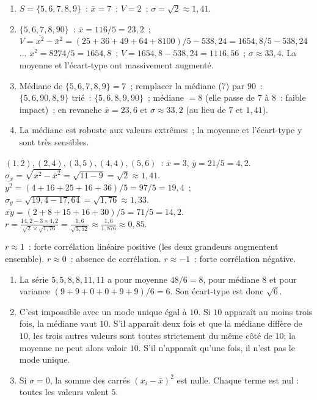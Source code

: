 
\begin{enumerate}
  \item $S=\{5,6,7,8,9\}$~: $\bar{x}=7$~; $V=2$~; $\sigma=\sqrt{2}\approx1{,}41$.
  \item $\{5,6,7,8,90\}$~: $\bar{x}=116/5=23{,}2$~;
        $V=\overline{x^2}-\bar{x}^2=(25+36+49+64+8100)/5-538{,}24=1654{,}8/5-538{,}24$
        ... $\overline{x^2}=8274/5=1654{,}8$~; $V=1654{,}8-538{,}24=1116{,}56$~; $\sigma\approx33{,}4$.
        La moyenne et l'\'ecart-type ont massivement augment\'e.
  \item M\'ediane de $\{5,6,7,8,9\}=7$~; remplacer la m\'ediane ($7$) par $90$~:
        $\{5,6,90,8,9\}$ tri\'e~: $\{5,6,8,9,90\}$~; m\'ediane $=8$ (elle passe de $7$ \`a $8$~: faible impact)~;
        en revanche $\bar{x}=23{,}6$ et $\sigma\approx33{,}2$ (au lieu de $7$ et $1{,}41$).
  \item La m\'ediane est robuste aux valeurs extr\^emes~; la moyenne et l'\'ecart-type y sont tr\`es sensibles.
\end{enumerate}


$(1,2),(2,4),(3,5),(4,4),(5,6)$~: $\bar{x}=3$, $\bar{y}=21/5=4{,}2$.
$\sigma_x=\sqrt{\overline{x^2}-\bar{x}^2}=\sqrt{11-9}=\sqrt{2}\approx1{,}41$.
$\overline{y^2}=(4+16+25+16+36)/5=97/5=19{,}4$~; $\sigma_y=\sqrt{19{,}4-17{,}64}=\sqrt{1{,}76}\approx1{,}33$.
$\overline{xy}=(2+8+15+16+30)/5=71/5=14{,}2$.
$r=\frac{14{,}2-3\times4{,}2}{\sqrt{2}\times\sqrt{1{,}76}}=\frac{1{,}6}{\sqrt{3{,}52}}\approx\frac{1{,}6}{1{,}876}\approx0{,}85$.

$r\approx1$~: forte corr\'elation lin\'eaire positive (les deux grandeurs augmentent ensemble).
$r\approx0$~: absence de corr\'elation. $r\approx-1$~: forte corr\'elation n\'egative.


\begin{enumerate}
  \item La s\'erie $5,5,8,8,11,11$ a pour moyenne $48/6=8$,
        pour m\'ediane $8$ et pour variance $(9+9+0+0+9+9)/6=6$.
        Son \'ecart-type est donc $\sqrt6$.
  \item C'est impossible avec un mode unique \'egal \`a $10$.
        Si $10$ appara\^it au moins trois fois, la m\'ediane vaut $10$.
        S'il appara\^it deux fois et que la m\'ediane diff\`ere de $10$,
        les trois autres valeurs sont toutes strictement du m\^eme c\^ot\'e de $10$;
        la moyenne ne peut alors valoir $10$.
        S'il n'appara\^it qu'une fois, il n'est pas le mode unique.
  \item Si $\sigma=0$, la somme des carr\'es $(x_i-\bar x)^2$ est nulle.
        Chaque terme est nul : toutes les valeurs valent $5$.
\end{enumerate}

